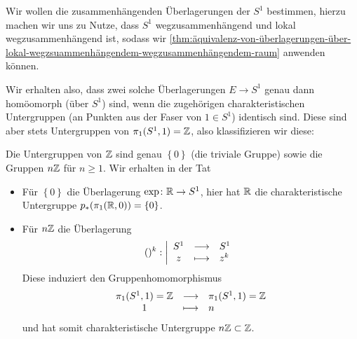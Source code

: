 \begin{example}
    Wir wollen die zusammenhängenden Überlagerungen der $S^1$ bestimmen, hierzu machen wir uns zu Nutze, dass $S^1$ wegzusammenhängend und lokal wegzusammenhängend ist, sodass wir  \autoref{thm:äquivalenz-von-überlagerungen-über-lokal-wegzsuammenhängendem-wegzusammenhängendem-raum} anwenden können.

    Wir erhalten also, dass zwei solche Überlagerungen $E\to S^1$ genau dann homöomorph (über $S^1$) sind, wenn die zugehörigen charakteristischen Untergruppen (an Punkten aus der Faser von $1\in S^1$) identisch sind. Diese sind aber stets Untergruppen von $\pi_1(S^1,1) = \mathbb{Z}$, also klassifizieren wir diese:

    Die Untergruppen von $\mathbb{Z}$ sind genau $\left \{0\right\} $ (die triviale Gruppe) sowie die Gruppen $n\mathbb{Z}$ für $n\geq 1$. Wir erhalten in der Tat
    \begin{itemize}
        \item Für $\left \{0\right\} $ die Überlagerung $\exp \colon  \mathbb{R} \to  S^1$, hier hat $\mathbb{R}$ die charakteristische Untergruppe $p_*(\pi_1(\mathbb{R},0)) = \left \{0\right\} $.
        \item Für $n\mathbb{Z}$ die Überlagerung
                \begin{equation*}
                    ()^k : \left| \begin{array}{c c l} 
                S^1 & \longrightarrow & S^1 \\
                z & \longmapsto &  z^k
                \end{array} \right.
            \end{equation*}
        Diese induziert den Gruppenhomomorphismus
            \begin{equation*}
            \begin{array}{c c l} 
                \pi_1(S^1,1) = \mathbb{Z} & \longrightarrow & \pi_1(S^1,1) = \mathbb{Z} \\
            1 & \longmapsto &  n
            \end{array}
        \end{equation*}
        und hat somit charakteristische Untergruppe $n\mathbb{Z}\subset \mathbb{Z}$.


\end{itemize}
\end{example}
